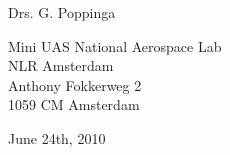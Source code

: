 \documentclass[a4paper,pdf]{article}
\begin{document}
\begin{center}
\vspace{0.5cm}

Drs. G. Poppinga

\vspace{0.25cm}
Mini UAS National Aerospace Lab\\
NLR Amsterdam\\
Anthony Fokkerweg 2\\
1059 CM Amsterdam


\vspace{1.5cm}

June 24th, 2010

\end{center}
\end{document}
